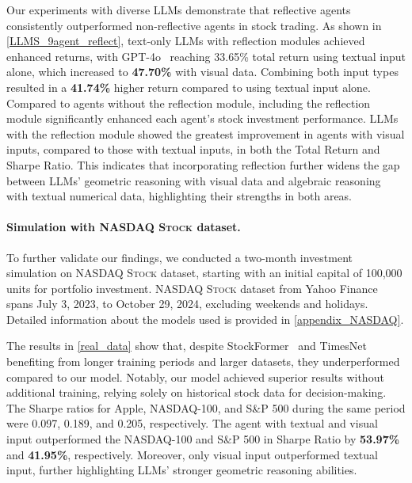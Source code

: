 Our experiments with diverse LLMs demonstrate that reflective agents consistently outperformed non-reflective agents in stock trading. As shown in \autoref{LLMS_9agent_reflect}, text-only LLMs with reflection modules achieved enhanced returns, with GPT-4o~\citep{GPT4o} reaching 33.65\% total return using textual input alone, which increased to \textbf{47.70\%} with visual data. Combining both input types resulted in a \textbf{41.74\%} higher return compared to using textual input alone. Compared to agents without the reflection module, including the reflection module significantly enhanced each agent's stock investment performance. LLMs with the reflection module showed the greatest improvement in agents with visual inputs, compared to those with textual inputs, in both the Total Return and Sharpe Ratio. This indicates that incorporating reflection further widens the gap between LLMs' geometric reasoning with visual data and algebraic reasoning with textual numerical data, highlighting their strengths in both areas. 



\vspace{-3pt}

\paragraph{Simulation with \textsc{NASDAQ Stock} dataset.}

To further validate our findings, we conducted a two-month investment simulation on \textsc{NASDAQ Stock} dataset, starting with an initial capital of 100,000 units for portfolio investment. \textsc{NASDAQ Stock} dataset from Yahoo Finance spans July 3, 2023, to October 29, 2024, excluding weekends and holidays. Detailed information about the models used is provided in \autoref{appendix_NASDAQ}.

The results in \autoref{real_data} show that, despite StockFormer~\citep{stockformer} and TimesNet~\citep{timesnet}
benefiting from longer training periods and larger datasets, they underperformed compared to our model. Notably, our model achieved superior results without additional training, relying solely on historical stock data for decision-making. The Sharpe ratios for Apple, NASDAQ-100, and S\&P 500 during the same period were 0.097, 0.189, and 0.205, respectively. The agent with textual and visual input outperformed the NASDAQ-100 and S\&P 500 in Sharpe Ratio by \textbf{53.97\%} and \textbf{41.95\%}, respectively. Moreover, only visual input outperformed textual input, further highlighting LLMs' stronger geometric reasoning abilities.

